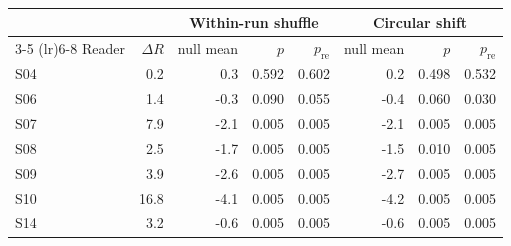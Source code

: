 \begin{tabular}{lrrrrrrr}
\toprule
 & & \multicolumn{3}{c}{Within-run shuffle} & \multicolumn{3}{c}{Circular shift} \\
\cmidrule(lr){3-5} \cmidrule(lr){6-8}
Reader & $\Delta R$ & null mean & $p$ & $p_\text{re}$ & null mean & $p$ & $p_\text{re}$ \\
\midrule
S04 & 0.2 & 0.3 & 0.592 & 0.602 & 0.2 & 0.498 & 0.532 \\
S06 & 1.4 & -0.3 & 0.090 & 0.055 & -0.4 & 0.060 & 0.030 \\
S07 & 7.9 & -2.1 & 0.005 & 0.005 & -2.1 & 0.005 & 0.005 \\
S08 & 2.5 & -1.7 & 0.005 & 0.005 & -1.5 & 0.010 & 0.005 \\
S09 & 3.9 & -2.6 & 0.005 & 0.005 & -2.7 & 0.005 & 0.005 \\
S10 & 16.8 & -4.1 & 0.005 & 0.005 & -4.2 & 0.005 & 0.005 \\
S14 & 3.2 & -0.6 & 0.005 & 0.005 & -0.6 & 0.005 & 0.005 \\
\bottomrule
\end{tabular}

